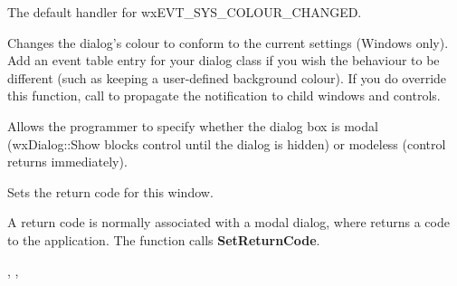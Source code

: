 \label{wxdialogonsyscolourchanged}


The default handler for wxEVT\_SYS\_COLOUR\_CHANGED.




Changes the dialog's colour to conform to the current settings (Windows only).
Add an event table entry for your dialog class if you wish the behaviour
to be different (such as keeping a user-defined
background colour). If you do override this function, call  to
propagate the notification to child windows and controls.



\label{wxdialogsetmodal}


Allows the programmer to specify whether the dialog box is modal (wxDialog::Show blocks control
until the dialog is hidden) or modeless (control returns immediately).



\label{wxdialogsetreturncode}


Sets the return code for this window.




A return code is normally associated with a modal dialog, where  returns
a code to the application. The function  calls {\bf SetReturnCode}.


, ,\rtfsp
{}

